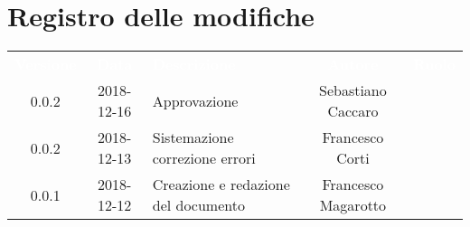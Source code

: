 \section*{Registro delle modifiche}
{
	\renewcommand{\arraystretch}{1.5}
	\centering
	\begin{longtable}{ c c  C{4cm}  c  c }
		
		\textcolor{white}{\textbf{Versione}} & \textcolor{white}{\textbf{Data}} & \textcolor{white}{\textbf{Descrizione}} & \textcolor{white}{\textbf{Autore}} & \textcolor{white}{\textbf{Ruolo}}\\	
		
		0.0.2 & 2018-12-16 & Approvazione & Sebastiano Caccaro & \Res{} \\
		
		0.0.2 & 2018-12-13 & Sistemazione correzione errori & Francesco Corti & \ana{} \\
		
		0.0.1 & 2018-12-12 & Creazione e redazione del documento & Francesco Magarotto & \ana{} \\
		
	\end{longtable}

}